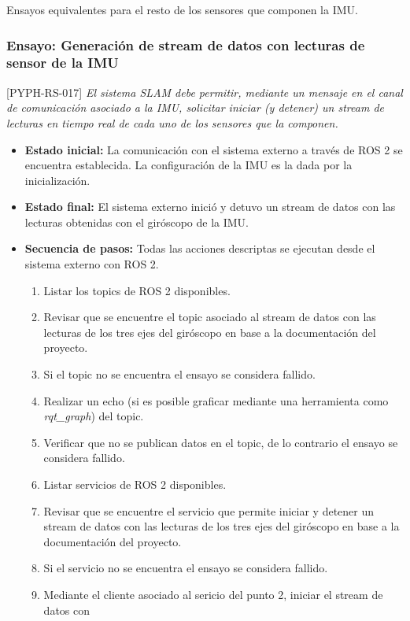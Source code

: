 \documentclass[
11pt, %
codirector, %
]{simple_charter}
\begin{document}
Ensayos equivalentes para el resto de los sensores que componen la IMU.

\subsubsection{Ensayo: Generación de stream de datos con lecturas de sensor de la IMU}
\label{sssec:ensayo-generacion-de-stream-de-datos-con-lecturas-de-sensor-de-la-imu}

[PYPH-RS-017] \textit{El sistema SLAM debe permitir, mediante un mensaje en el canal de comunicación
asociado a la IMU, solicitar iniciar (y detener) un stream de lecturas en tiempo real de cada uno de
los sensores que la componen.}

\begin{itemize}
	\item \textbf{Estado inicial:} La comunicación con el sistema externo a través de ROS 2 se
	encuentra establecida. La configuración de la IMU es la dada por la inicialización.
	\item \textbf{Estado final:} El sistema externo inició y detuvo un stream de datos con las
	lecturas obtenidas con el giróscopo de la IMU.
	\item \textbf{Secuencia de pasos:} Todas las acciones descriptas se ejecutan desde el sistema
	externo con ROS 2.
	\begin{enumerate}
		\item Listar los topics de ROS 2 disponibles.
		\item Revisar que se encuentre el topic asociado al stream de datos con las lecturas de los
		tres ejes del giróscopo en base a la documentación del proyecto.
		\item Si el topic no se encuentra el ensayo se considera fallido.
		\item Realizar un echo (si es posible graficar mediante una herramienta como
		\textit{rqt\_graph}) del topic.
		\item Verificar que no se publican datos en el topic, de lo contrario el ensayo se considera
		fallido.
		\item Listar servicios de ROS 2 disponibles.
		\item Revisar que se encuentre el servicio que permite iniciar y detener un stream de datos
		con las lecturas de los tres ejes del giróscopo en base a la documentación del proyecto.
		\item Si el servicio no se encuentra el ensayo se considera fallido.
		\item Mediante el cliente asociado al sericio del punto 2, iniciar el stream de datos con

\end{enumerate}
\end{itemize}
\end{document}
